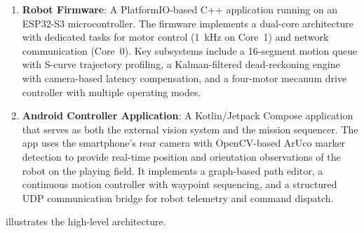 \documentclass[12pt, a4paper, twoside]{article}
\begin{document}
\begin{enumerate}[label=\arabic*.]
    \item \textbf{Robot Firmware}: A PlatformIO-based C++ application running on an ESP32-S3 microcontroller. The firmware implements a dual-core architecture with dedicated tasks for motor control (\SI{1}{\kilo\hertz} on Core~1) and network communication (Core~0). Key subsystems include a 16-segment motion queue with S-curve trajectory profiling, a Kalman-filtered dead-reckoning engine with camera-based latency compensation, and a four-motor mecanum drive controller with multiple operating modes.

    \item \textbf{Android Controller Application}: A Kotlin/Jetpack Compose application that serves as both the external vision system and the mission sequencer. The app uses the smartphone's rear camera with OpenCV-based ArUco marker detection to provide real-time position and orientation observations of the robot on the playing field. It implements a graph-based path editor, a continuous motion controller with waypoint sequencing, and a structured UDP communication bridge for robot telemetry and command dispatch.
\end{enumerate}

 illustrates the high-level architecture.
\end{document}
